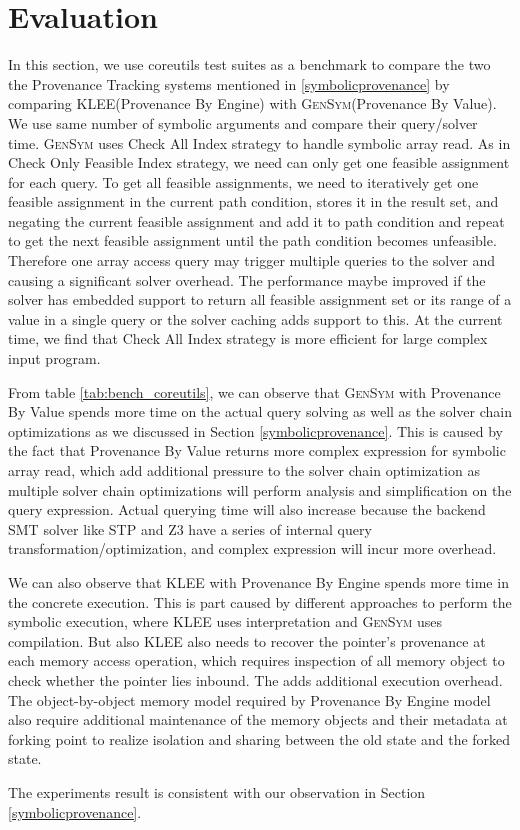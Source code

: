 \documentclass[sigplan, nonacm]{acmart}\settopmatter{printfolios=true,printccs=false,printacmref=false}
\newcommand{\tool}{\textsc{GenSym}\xspace}
\newcommand{\klee}{\textsc{KLEE}\xspace}
\begin{document}
\section{Evaluation}\label{evaluation}

In this section, we use coreutils test suites as a benchmark to compare the two the Provenance Tracking systems mentioned in \ref{symbolicprovenance} by comparing \klee (Provenance By Engine) with \tool (Provenance By Value). We use same number of symbolic arguments and compare their query/solver time. \tool uses Check All Index strategy to handle symbolic array read. As in Check Only Feasible Index strategy,  we need can only get one feasible assignment for each query. To get all feasible assignments, we need to iteratively get one feasible assignment in the current path condition, stores it in the result set, and negating the current feasible assignment and add it to path condition and repeat to get the next feasible assignment until the path condition becomes unfeasible. Therefore one array access query may trigger multiple queries to the solver and causing a significant solver overhead. The performance maybe improved if the solver has embedded support to return all feasible assignment set or its range of a value in a single query or the solver caching adds support to this. At the current time, we find that Check All Index strategy is more efficient for large complex input program.\par
From table \ref{tab:bench_coreutils}, we can observe that \tool with Provenance By Value spends more time on the actual query solving as well as the solver chain optimizations as we discussed in Section \ref{symbolicprovenance}. This is caused by the fact that Provenance By Value returns more complex expression for symbolic array read, which add additional pressure to the solver chain optimization as multiple solver chain optimizations will perform analysis and simplification on the query expression. Actual querying time will also increase because the backend SMT solver like STP and Z3 have a series of internal query transformation/optimization, and complex expression will incur more overhead.\par
We can also observe that \klee with Provenance By Engine spends more time in the concrete execution. This is part caused by different approaches to perform the symbolic execution, where \klee uses interpretation and \tool uses compilation. But also \klee also needs to recover the pointer's provenance at each memory access operation, which requires inspection of all memory object to check whether the pointer lies inbound. The adds additional execution overhead. The object-by-object memory model required by Provenance By Engine model also require additional maintenance of the memory objects and their metadata at forking point to realize isolation and sharing between the old state and the forked state.\par
The experiments result is consistent with our observation in Section \ref{symbolicprovenance}.
\end{document}
